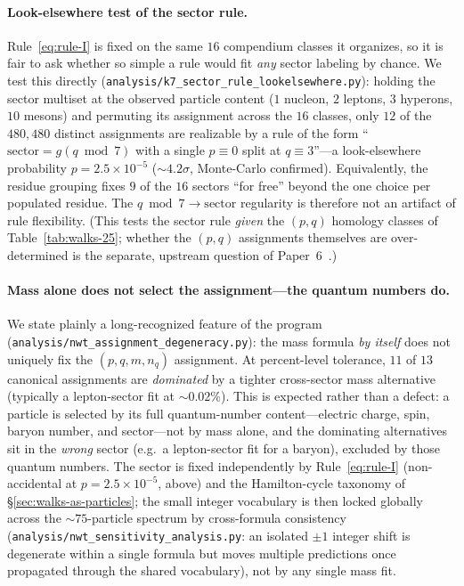 \documentclass[11pt]{article}
\begin{document}
\paragraph{Look-elsewhere test of the sector rule.}  Rule~\eqref{eq:rule-I} is fixed on the same $16$ compendium classes it organizes, so it is fair to ask whether so simple a rule would fit \emph{any} sector labeling by chance.  We test this directly (\texttt{analysis/k7\_sector\_rule\_lookelsewhere.py}): holding the sector multiset at the observed particle content ($1$ nucleon, $2$ leptons, $3$ hyperons, $10$ mesons) and permuting its assignment across the $16$ classes, only $12$ of the $480{,}480$ distinct assignments are realizable by a rule of the form ``$\mathrm{sector} = g(q \bmod 7)$ with a single $p \equiv 0$ split at $q \equiv 3$''---a look-elsewhere probability $p = 2.5 \times 10^{-5}$ ($\sim 4.2\sigma$, Monte-Carlo confirmed).  Equivalently, the residue grouping fixes $9$ of the $16$ sectors ``for free'' beyond the one choice per populated residue.  The $q \bmod 7 \to \mathrm{sector}$ regularity is therefore not an artifact of rule flexibility.  (This tests the sector rule \emph{given} the $(p, q)$ homology classes of Table~\ref{tab:walks-25}; whether the $(p, q)$ assignments themselves are over-determined is the separate, upstream question of Paper~6~\cite{Paper6}.)

\paragraph{Mass alone does not select the assignment---the quantum numbers do.}  We state plainly a long-recognized feature of the program (\texttt{analysis/nwt\_assignment\_degeneracy.py}): the mass formula \emph{by itself} does not uniquely fix the $(p, q, m, n_q)$ assignment.  At percent-level tolerance, $11$ of $13$ canonical assignments are \emph{dominated} by a tighter cross-sector mass alternative (typically a lepton-sector fit at $\sim 0.02\%$).  This is expected rather than a defect: a particle is selected by its full quantum-number content---electric charge, spin, baryon number, and sector---not by mass alone, and the dominating alternatives sit in the \emph{wrong} sector (e.g.\ a lepton-sector fit for a baryon), excluded by those quantum numbers.  The sector is fixed independently by Rule~\eqref{eq:rule-I} (non-accidental at $p = 2.5 \times 10^{-5}$, above) and the Hamilton-cycle taxonomy of \S\ref{sec:walks-as-particles}; the small integer vocabulary is then locked globally across the $\sim 75$-particle spectrum by cross-formula consistency (\texttt{analysis/nwt\_sensitivity\_analysis.py}: an isolated $\pm 1$ integer shift is degenerate within a single formula but moves multiple predictions once propagated through the shared vocabulary), not by any single mass fit.
\end{document}
